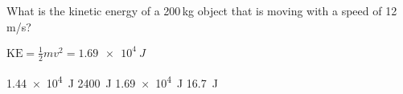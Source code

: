 \documentclass[]{exam}
\begin{document}
\begin{questions}













\question %
What is the kinetic energy of a 200\,kg object that is moving with a speed of 12\,m/s?

\ifprintanswers
{\color{red} $\mathrm{KE} = \frac{1}{2}mv^2 = \boxed{\SI{1.69e4}{J}}$}
\fi

\begin{randomizechoices}
    \correctchoice \SI{1.44e4}{J}
    \choice \SI{2400}{J}
    \choice \SI{1.69e4}{J}
    \choice \SI{16.7}{J}
\end{randomizechoices}


\end{questions}
\end{document}
